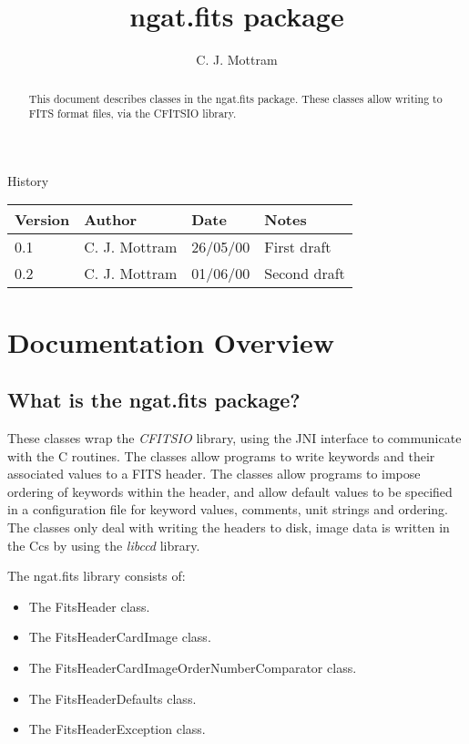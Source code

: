 \documentclass[10pt,a4paper]{article}
\title{ngat.fits package}
\author{C. J. Mottram}
\date{}
\begin{document}
\thispagestyle{empty}
\maketitle
\begin{abstract}
This document describes classes in the ngat.fits package.
These classes allow writing to FITS format files, via the CFITSIO library.
\end{abstract}

\centerline{\Large History}
\begin{center}
\begin{tabular}{|l|l|l|p{15em}|}
\hline
{\bf Version} & {\bf Author} & {\bf Date} & {\bf Notes} \\
\hline
0.1 &              C. J. Mottram & 26/05/00 & First draft \\
0.2 &              C. J. Mottram & 01/06/00 & Second draft \\
\hline
\end{tabular}
\end{center}

\newpage
\tableofcontents
\listoffigures
\listoftables
\newpage

\section{Documentation Overview}
\subsection{What is the ngat.fits package?}
These classes wrap the {\em CFITSIO} library, using the JNI interface to communicate with the C routines.
The classes allow programs to write keywords and their associated values to a FITS header. 
The classes allow programs to impose ordering of keywords within the header, and allow default values to
be specified in a configuration file for keyword values, comments, unit strings and ordering. The classes
only deal with writing the headers to disk, image data is written in the Ccs by using the {\em libccd}
\cite{bib:libccd} library.

The ngat.fits library consists of:
\begin{itemize}
\item The FitsHeader class.
\item The FitsHeaderCardImage class.
\item The FitsHeaderCardImageOrderNumberComparator class.
\item The FitsHeaderDefaults class.
\item The FitsHeaderException class.
\end{itemize}
 
\end{document}
